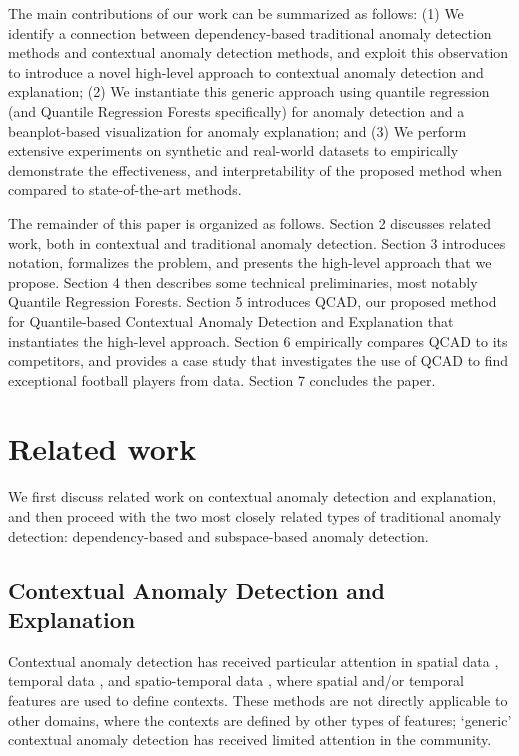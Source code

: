 \documentclass[pdflatex,sn-basic]{sn-jnl}%
\theoremstyle{thmstyleone}%
\theoremstyle{thmstyletwo}%
\theoremstyle{thmstylethree}%
\begin{document}
The main contributions of our work can be summarized as follows: (1) We identify a connection between dependency-based traditional anomaly detection methods and contextual anomaly detection methods, and exploit this observation to introduce a novel high-level approach to contextual anomaly detection and explanation; (2) We instantiate this generic approach using quantile regression (and Quantile Regression Forests specifically) for anomaly detection and a beanplot-based visualization for anomaly explanation; and (3) We perform extensive experiments on synthetic and real-world datasets to empirically demonstrate the effectiveness, and interpretability of the proposed method when compared to state-of-the-art methods.

The remainder of this paper is organized as follows. Section 2 discusses related work, both in contextual and traditional anomaly detection. Section 3 introduces notation, formalizes the problem, and presents the high-level approach that we propose. Section 4 then describes some technical preliminaries, most notably Quantile Regression Forests. Section 5 introduces QCAD, our proposed method for Quantile-based Contextual Anomaly Detection and Explanation that instantiates the high-level approach. Section 6 empirically compares QCAD to its competitors, and provides a case study that investigates the use of QCAD to find exceptional football players from data. Section 7 concludes the paper.

\section{Related work}
\label{sec:relatedWork}

We first discuss related work on contextual anomaly detection and explanation, and then proceed with the two most closely related types of traditional anomaly detection: dependency-based and subspace-based anomaly detection.

\subsection{Contextual Anomaly Detection and Explanation}

Contextual anomaly detection has received particular attention in spatial data \citep{cai2013spatial}, temporal data \citep{salvador2004learning}, and spatio-temporal data \citep{smets2009discovering}, where spatial and/or temporal features are used to define contexts. These methods are not directly applicable to other domains, where the contexts are defined by other types of features; `generic' contextual anomaly detection has received limited attention in the community.
\end{document}
